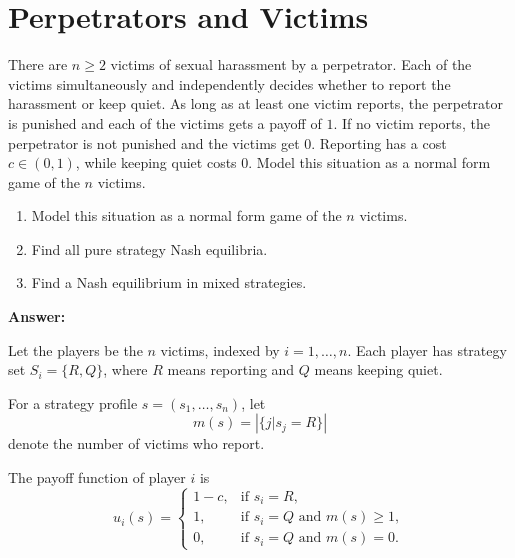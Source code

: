 \documentclass[12pt,a4paper]{article}
\begin{document}
\section{Perpetrators and Victims}
There are \(n \ge 2\) victims of sexual harassment by a perpetrator. Each of the victims simultaneously and independently decides whether to report the harassment or keep quiet. As long as at least one victim reports, the perpetrator is punished and each of the victims gets a payoff of \(1\). If no victim reports, the perpetrator is not punished and the victims get \(0\). Reporting has a cost \(c \in (0,1)\), while keeping quiet costs \(0\). Model this situation as a normal form game of the \(n\) victims.

\begin{enumerate}[label=(\alph*)]
  \item Model this situation as a normal form game of the \(n\) victims.
  \item Find all pure strategy Nash equilibria.
  \item Find a Nash equilibrium in mixed strategies.
\end{enumerate}

\vspace{0.5cm}

\noindent\textbf{Answer: }

Let the players be the \(n\) victims, indexed by \(i=1,\dots,n\). Each player has strategy set \(S_i=\{R,Q\}\), where \(R\) means reporting and \(Q\) means keeping quiet.

For a strategy profile \(s=(s_1,\dots,s_n)\), let
\[
m(s)=\left|\{j|s_j=R\}\right|
\]
denote the number of victims who report.

The payoff function of player \(i\) is
\[
u_i(s)=
\begin{cases}
1-c, & \text{if } s_i=R,\\[4pt]
1, & \text{if } s_i=Q \text{ and } m(s)\ge 1,\\[4pt]
0, & \text{if } s_i=Q \text{ and } m(s)=0.
\end{cases}
\]
\end{document}
